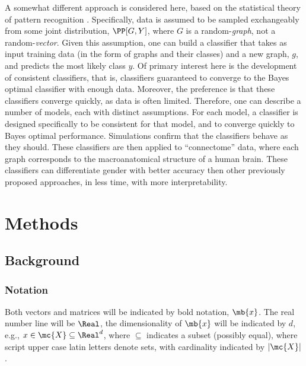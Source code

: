 A somewhat different approach is considered here, based on the statistical theory of pattern recognition \cite{DGL96}.  Specifically, data is assumed to be sampled exchangeably from some joint distribution, $\PP[G,Y]$, where $G$ is a random-\emph{graph}, not a random-\emph{vector}.  Given this assumption, one can build a classifier that takes as input training data (in the form of graphs and their classes) and a new graph, $g$, and predicts the most likely class $y$.  Of primary interest here is the development of consistent classifiers, that is, classifiers guaranteed to converge to the Bayes optimal classifier with enough data.  Moreover, the preference is that these classifiers converge quickly, as data is often limited.  Therefore, one can describe a number of models, each with distinct assumptions.  For each model, a classifier is designed specifically to be consistent for that model, and to converge quickly to Bayes optimal performance.  Simulations confirm that the classifiers behave as they should.  These classifiers are then applied to ``connectome'' data, where each graph corresponds to the macroanatomical structure of a human brain.  These classifiers can differentiate gender with better accuracy then other previously proposed approaches, in less time, with more interpretability.


\section{Methods} %
\label{sec:methods}

\subsection{Background} %

\subsubsection{Notation}
Both vectors and matrices will be indicated by bold notation, $\mb{x}$.  The real number line will be $\Real$, the dimensionality of $\mb{x}$ will be indicated by $d$, e.g., $x \in \mc{X} \subseteq \Real^{d}$, where $\subseteq$ indicates a subset (possibly equal), where script upper case latin letters denote sets, with cardinality indicated by $|\mc{X}|$. 




